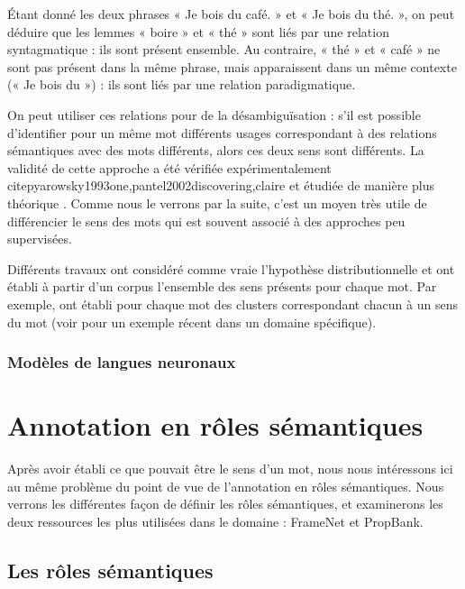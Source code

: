 Étant donné les deux phrases « Je bois du café. » et « Je bois du thé. », on
peut déduire que les lemmes « boire » et « thé » sont liés par une relation
syntagmatique : ils sont présent ensemble. Au contraire, « thé » et « café » ne
sont pas présent dans la même phrase, mais apparaissent dans un même contexte
(« Je bois du ») : ils sont liés par une relation paradigmatique.

On peut utiliser ces relations pour de la désambiguïsation : s'il est possible
d'identifier pour un même mot différents usages correspondant à des relations
sémantiques avec des mots différents, alors ces deux sens sont différents. La
validité de cette approche a été vérifiée expérimentalement
citep{yarowsky1993one,pantel2002discovering,claire} et étudiée de manière plus
théorique \citep{sahlgren2006word,sahlgren2008distributional}. Comme nous le
verrons par la suite, c'est un moyen très utile de différencier le sens des
mots qui est souvent associé à des approches peu supervisées.

Différents travaux ont considéré comme vraie l'hypothèse distributionnelle et
ont établi à partir d'un corpus l'ensemble des sens présents pour chaque mot.
Par exemple,
\cite{schutze1998automatic,pantel2002discovering,niu2007three,pedersen2010duluth}
ont établi pour chaque mot des clusters correspondant chacun à un sens du mot
(voir \cite{liu2012semantic} pour un exemple récent dans un domaine
spécifique).

\subsubsection{Modèles de langues neuronaux}

\section{Annotation en rôles sémantiques}
\label{senssituation}

Après avoir établi ce que pouvait être le sens d'un mot, nous nous intéressons
ici au même problème du point de vue de l'annotation en rôles sémantiques. Nous
verrons les différentes façon de définir les rôles sémantiques, et examinerons
les deux ressources les plus utilisées dans le domaine : FrameNet et PropBank.

\subsection{Les rôles sémantiques}
\label{subsec:roles_semantiques}

